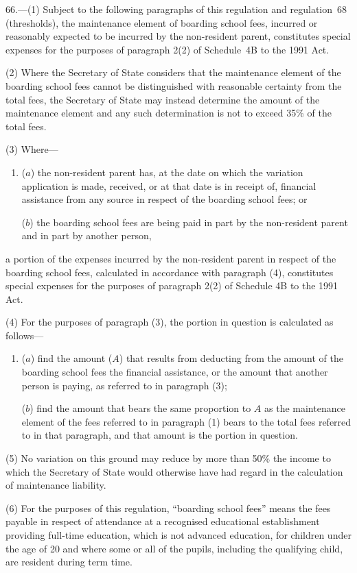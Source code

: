 \documentclass[12pt,a4paper]{article}
\begin{document}
66.---(1)  Subject to the following paragraphs of this regulation and regulation~68 (thresholds), the maintenance element of boarding school fees, incurred or reasonably expected to be incurred by the non-resident parent, constitutes special expenses for the purposes of paragraph 2(2) of Schedule~4B to the 1991 Act.

(2) Where the Secretary of State considers that the maintenance element of the boarding school fees cannot be distinguished with reasonable certainty from the total fees, the Secretary of State may instead determine the amount of the maintenance element and any such determination is not to exceed 35\% of the total fees.

(3) Where—
\begin{enumerate}\item[]
($a$) the non-resident parent has, at the date on which the variation application is made, received, or at that date is in receipt of, financial assistance from any source in respect of the boarding school fees; or

($b$) the boarding school fees are being paid in part by the non-resident parent and in part by another person,
\end{enumerate}
a portion of the expenses incurred by the non-resident parent in respect of the boarding school fees, calculated in accordance with paragraph (4), constitutes special expenses for the purposes of paragraph 2(2) of Schedule 4B to the 1991 Act.

(4) For the purposes of paragraph (3), the portion in question is calculated as follows—
\begin{enumerate}\item[]
($a$) find the amount ($A$) that results from deducting from the amount of the boarding school fees the financial assistance, or the amount that another person is paying, as referred to in paragraph (3);

($b$) find the amount that bears the same proportion to $A$ as the maintenance element of the fees referred to in paragraph (1) bears to the total fees referred to in that paragraph, and that amount is the portion in question.
\end{enumerate}

(5) No variation on this ground may reduce by more than 50\% the income to which the Secretary of State would otherwise have had regard in the calculation of maintenance liability.

(6) For the purposes of this regulation, “boarding school fees” means the fees payable in respect of attendance at a recognised educational establishment providing full-time education, which is not advanced education, for children under the age of 20 and where some or all of the pupils, including the qualifying child, are resident during term time.
\end{document}

